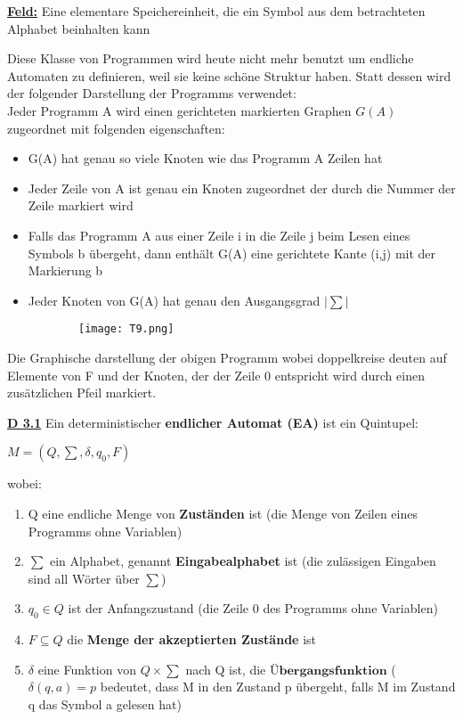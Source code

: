 \documentclass[8pt]{extreport}
\begin{document}
\underline{\textbf{Feld:}} Eine elementare Speichereinheit, die ein Symbol aus dem betrachteten Alphabet beinhalten kann

Diese Klasse von Programmen wird heute nicht mehr benutzt um endliche Automaten zu definieren, weil sie keine schöne Struktur haben. Statt dessen wird der folgender Darstellung der Programms verwendet:\\
Jeder Programm A wird einen gerichteten markierten Graphen $G(A)$ zugeordnet mit folgenden eigenschaften:

\begin{itemize}
\item G(A) hat genau so viele Knoten wie das Programm A Zeilen hat
\item Jeder Zeile von A ist genau ein Knoten zugeordnet der durch die Nummer der Zeile markiert wird
\item Falls das Programm A aus einer Zeile i in die Zeile j beim Lesen eines Symbols b übergeht, dann enthält G(A) eine gerichtete Kante (i,j) mit der Markierung b
\item Jeder Knoten von G(A) hat genau den Ausgangsgrad $|\sum|$
\end{itemize}
\begin{figure}[H]
\centering
\begin{subfigure}[b]{0.4\linewidth}
\texttt{[image: T9.png]}
\end{subfigure}
\end{figure}
Die Graphische darstellung der obigen Programm wobei doppelkreise deuten auf Elemente von F und der Knoten, der der Zeile 0 entspricht wird durch einen zusätzlichen Pfeil markiert.

\underline{\textbf{D 3.1}} Ein deterministischer \textbf{endlicher Automat (EA)} ist ein Quintupel:
\begin{center}
$M=(Q,\sum,\delta,q_0,F)$
\end{center}
wobei:
\begin{enumerate}
\item Q eine endliche Menge von \textbf{Zuständen} ist (die Menge von Zeilen eines Programms ohne Variablen)
\item $\sum$ ein Alphabet, genannt \textbf{Eingabealphabet} ist (die zulässigen Eingaben sind all Wörter über $\sum$)
\item $q_0 \in Q$ ist der Anfangszustand (die Zeile 0 des Programms ohne Variablen)
\item $F \subseteq Q$ die \textbf{Menge der akzeptierten Zustände} ist
\item $\delta$ eine Funktion von $Q \times \sum$ nach Q ist, die $\textbf{Übergangsfunktion}$ ($\delta(q,a) = p$ bedeutet, dass M in den Zustand p übergeht, falls M im Zustand q das Symbol a gelesen hat)
\end{enumerate}
\end{document}
